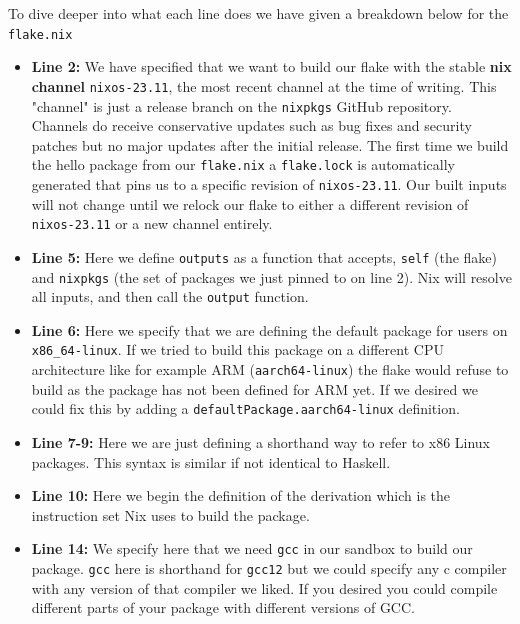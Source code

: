 To dive deeper into what each line does we have given a breakdown below for the \texttt{flake.nix}
{ \small
\begin{itemize}[itemsep=-0.25em]
  \item \textbf{Line 2:} We have specified that we want to build our flake with the stable \textbf{nix channel} \texttt{nixos-23.11}, the most recent channel at the time of writing. This "channel" is just a release branch on the \texttt{nixpkgs} GitHub repository. Channels do receive conservative updates such as bug fixes and security patches but no major updates after the initial release. The first time we build the hello package from our \texttt{flake.nix} a \texttt{flake.lock} is automatically generated that pins us to a specific revision of \texttt{nixos-23.11}. Our built inputs will not change until we relock our flake to either a different revision of \texttt{nixos-23.11} or a new channel entirely. 

  \item \textbf{Line 5:} Here we define \texttt{outputs} as a function that accepts, \texttt{self} (the flake) and \texttt{nixpkgs} (the set of packages we just pinned to on line 2). Nix will resolve all inputs, and then call the \texttt{output} function.
  
  \item \textbf{Line 6:} Here we specify that we are defining the default package for users on \texttt{x86\_64-linux}. If we tried to build this package on a different CPU architecture like for example ARM (\texttt{aarch64-linux}) the flake would refuse to build as the package has not been defined for ARM yet. If we desired we could fix this by adding a \texttt{defaultPackage.aarch64-linux} definition.

  \item \textbf{Line 7-9:} Here we are just defining a shorthand way to refer to x86 Linux packages. This syntax is similar if not identical to Haskell.

  \item \textbf{Line 10:} Here we begin the definition of the derivation which is the instruction set Nix uses to build the package.
  
  \item \textbf{Line 14:} We specify here that we need \texttt{gcc} in our sandbox to build our package. \texttt{gcc} here is shorthand for \texttt{gcc12} but we could specify any c compiler with any version of that compiler we liked. If you desired you could compile different parts of your package with different versions of GCC.


\end{itemize}}
